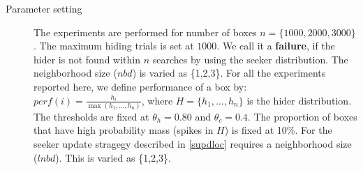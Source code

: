 \documentclass[11pt,a4paper]{article}
\begin{document}
\begin{description}
	\item[Parameter setting] The experiments are performed for number of boxes $n = \{1000, 2000, 3000\}$. The maximum hiding trials is set at $1000$. We call it a \textbf{failure}, if the hider is not found within $n$ searches by using the seeker distribution. The neighborhood size ($nbd$) is varied as \{1,2,3\}. For all the experiments reported here, we define performance of a box by: $perf(i) = \frac{h_i}{\max(h_1,\ldots, h_n)}$, where $H = \{h_1,\ldots, h_n\}$ is the hider distribution. The thresholds are fixed at $\theta_h = 0.80$ and $\theta_c = 0.4$. The proportion of boxes that have high probability mass (spikes in $H$) is fixed at 10\%. For the seeker update stragegy described in \ref{supdloc} requires a neighborhood size ($lnbd$). This is varied as \{1,2,3\}.
	\label{setting:base}


\end{description}
\end{document}
